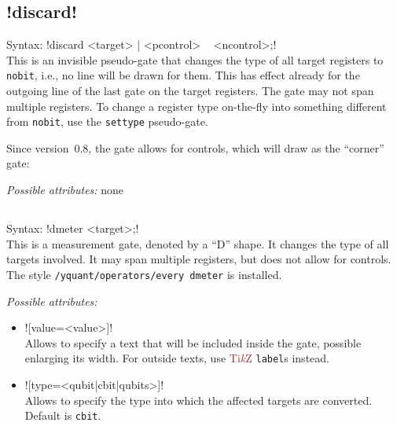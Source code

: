 \documentclass{scrartcl}
\def\TikZ{\textcolor{brown}{Ti\textit kZ}}
\def\ttlink{\link\texttt}
\begin{document}
      \subsection[\texorpdfstring{\yquant{discard}}{discard}]{\yquant!discard!}
         Syntax: \yquant!discard <target> | <pcontrol> ~ <ncontrol>;! \\
         This is an invisible pseudo\hyp gate that changes the type of all target registers to \ttlink{nobit}, i.e., no line will be drawn for them.
         This has effect already for the outgoing line of the last gate on the target registers.
         The gate may not span multiple registers.
         To change a register type on\hyp the\hyp fly into something different from \ttlink{nobit}, use the \ttlink{settype} pseudo\hyp gate.

         Since version~0.8, the gate allows for controls, which will draw as the ``corner'' gate:
         \begin{center}
            \begin{yquantgroup}
               \equals
            \end{yquantgroup}
         \end{center}

         \emph{Possible attributes:} none

      \subsection{\texorpdfstring{}{dmeter}}
         Syntax: \yquant!dmeter <target>;! \\
         This is a measurement gate, denoted by a ``D'' shape.
         It changes the type of all targets involved.
         It may span multiple registers, but does not allow for controls.
         The style \ttlink{/yquant/operators/every dmeter} is installed.

         \emph{Possible attributes:}
         \begin{itemize}
            \item \yquant![value=<value>]! \\
               Allows to specify a text that will be included inside the gate, possible enlarging its width.
               For outside texts, use \TikZ{} \texttt{label}s instead.
            \item \yquant![type=<qubit|cbit|qubits>]! \\
               Allows to specify the type into which the affected targets are converted.
               Default is \ttlink{cbit}.
         \end{itemize}
\end{document}
